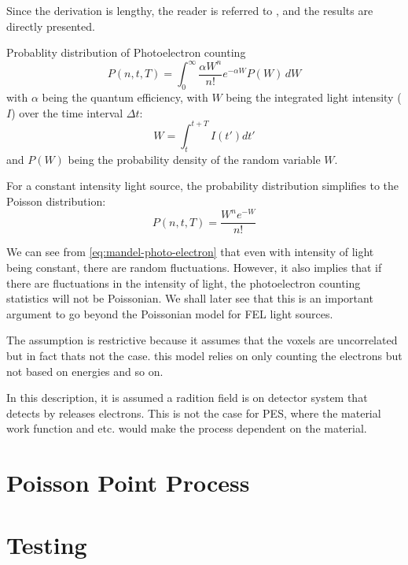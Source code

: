 Since the derivation is lengthy, the reader is referred to \cite{mehtaVIIITheoryPhotoelectron1970}, and the results are directly presented.
\begin{note}
    {Probablity distribution of Photoelectron counting}
    \begin{equation}\label{eq:mandel-photo-electron}
        P(n, t, T) = \int_{0}^{\infty} \frac{\alpha W^n}{n!} e^{-\alpha W} P(W) \, dW
    \end{equation}
    with $\alpha$ being the quantum efficiency, with $W$ being the integrated light intensity ($I$) over the time interval $\Delta t$:
    \begin{equation}
        W = \int_{t}^{t+T} I(t') dt'
    \end{equation}
    and $P(W)$ being the probability density of the random variable $W$.

    For a constant intensity light source, the probability distribution simplifies to the Poisson distribution:
    \begin{equation}
        P(n, t, T) = \frac{W^n e^{-W}}{n!} 
    \end{equation}
\end{note}

We can see from \ref{eq:mandel-photo-electron} that even with intensity of light being constant, there are random fluctuations. However, it also implies that if there are fluctuations in the intensity of light, the photoelectron counting statistics will not be Poissonian. We shall later see that this is an important argument to go beyond the Poissonian model for \gls{FEL} light sources.


The assumption is restrictive because it assumes that the voxels are uncorrelated but in fact thats not the case. this model relies on only counting the electrons but not based on energies and so on.

In this description, it is assumed a radition field is on detector system that detects by releases electrons. This is not the case for PES, where the material work function and etc. would make the process dependent on the material.

\section{Poisson Point Process}
\section{Testing}

